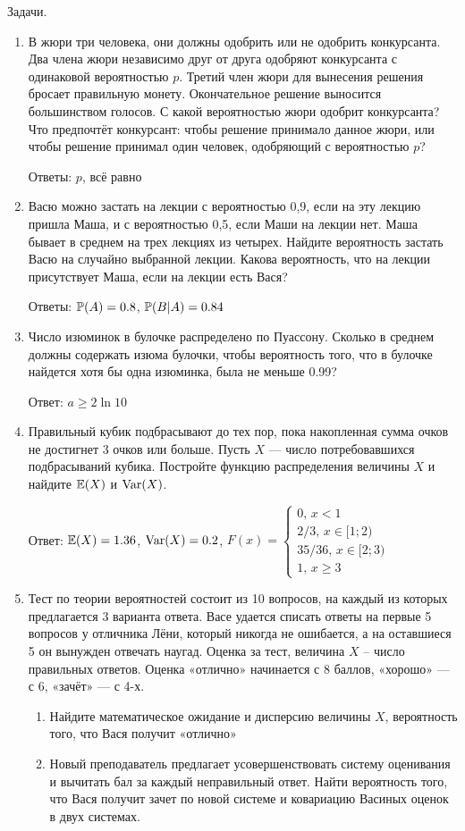 \documentclass[12pt, a4paper]{article}\usepackage[]{graphicx}\usepackage[]{color}
\begin{document}
Задачи.

\begin{enumerate}
\item В жюри три человека, они должны одобрить или не одобрить конкурсанта. Два члена жюри независимо друг от друга одобряют конкурсанта с  одинаковой вероятностью $p$. Третий член жюри для вынесения решения бросает правильную монету. Окончательное решение выносится большинством голосов. С какой вероятностью жюри одобрит конкурсанта? Что предпочтёт конкурсант: чтобы решение принимало данное жюри, или чтобы решение принимал один человек, одобряющий с вероятностью $p$?

Ответы: $p$, всё равно

\item Васю можно застать на лекции с вероятностью 0,9, если на эту лекцию пришла Маша, и с вероятностью 0,5, если Маши на лекции нет. Маша бывает в среднем на трех лекциях из четырех. Найдите вероятность застать Васю на случайно выбранной лекции. Какова вероятность, что на лекции присутствует Маша, если на лекции есть Вася?

Ответы: $\P(A)=0.8$, $\P(B|A)=0.84$

\item Число изюминок в булочке распределено по Пуассону. Сколько в среднем должны содержать изюма булочки, чтобы вероятность того, что в булочке найдется хотя бы одна изюминка, была не меньше 0.99?

Ответ: $a\geq 2\ln 10$

\item Правильный кубик подбрасывают до тех пор, пока накопленная сумма очков не достигнет 3 очков или больше. Пусть $X$ — число потребовавшихся подбрасываний кубика. Постройте функцию распределения величины $X$ и найдите $\E(X)$ и $\Var(X)$.

Ответ: $\E(X)=1.36$, $\Var(X)=0.2$, $F(x)=\begin{cases}
0, \, x<1 \\
2/3, \, x\in [1;2) \\
35/36, \, x\in[2;3) \\
1, \, x\geq 3
\end{cases}$

\item Тест по теории вероятностей состоит из 10 вопросов, на каждый из которых предлагается 3 варианта ответа. Васе удается списать ответы на первые 5 вопросов у отличника Лёни, который никогда не ошибается, а на оставшиеся 5 он вынужден отвечать наугад. Оценка за тест, величина $X$ – число правильных ответов. Оценка «отлично» начинается с 8 баллов, «хорошо» — с 6, «зачёт» — с 4-х.
\begin{enumerate}
\item Найдите математическое ожидание и дисперсию величины $X$, вероятность того, что Вася получит «отлично»
\item Новый преподаватель предлагает усовершенствовать систему оценивания и вычитать бал за каждый неправильный ответ. Найти вероятность того, что Вася получит зачет по новой системе и ковариацию Васиных оценок в двух системах.
\end{enumerate}


\end{enumerate}
\end{document}
